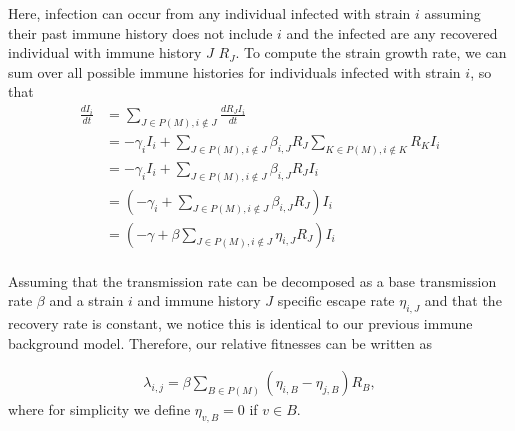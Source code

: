 \documentclass[12pt,oneside,letterpaper]{article}
\begin{document}
Here, infection can occur from any individual infected with strain $i$ assuming their past immune history does not include $i$ and the infected are any recovered individual with immune history $J$  $R_{J}$.
To compute the strain growth rate, we can sum over all possible immune histories for individuals infected with strain $i$, so that
\begin{align*}
    \frac{d I_{i}}{d t} &= \sum_{J \in P(M), i \notin J} \frac{dR_{J} I_{i}}{dt} \\
                        &= - \gamma_{i} I_{i} + \sum_{J \in P(M), i \notin J} \beta_{i, J} R_{J} \sum_{K \in P(M), i\notin K} R_{K}I_{i}\\
                        &= - \gamma_{i} I_{i} + \sum_{J \in P(M), i \notin J} \beta_{i, J} R_{J} I_{i}\\
                        &= \left(-\gamma_{i} + \sum_{J \in P(M), i \notin J} \beta_{i,J} R_{J} \right) I_{i}\\
                        &= \left(-\gamma + \beta\sum_{J \in P(M), i \notin J} \eta_{i,J} R_{J} \right) I_{i}\\
\end{align*}

Assuming that the transmission rate can be decomposed as a base transmission rate $\beta$ and a strain $i$ and immune history $J$ specific escape rate $\eta_{i, J}$ and that the recovery rate is constant, we notice this is identical to our previous immune background model.
Therefore, our relative fitnesses can be written as

\begin{align*}
    \lambda_{i, j} = \beta \sum_{B \in P(M)} (\eta_{i, B} - \eta_{j, B}) R_{B},
\end{align*}
where for simplicity we define $\eta_{v, B} = 0$ if $v \in B$.
\end{document}
